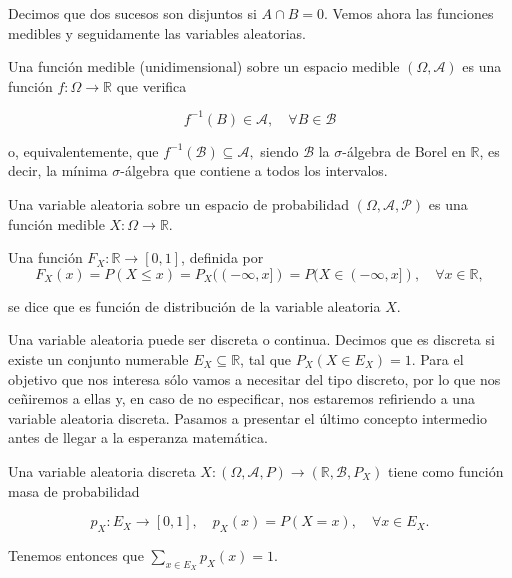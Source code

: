 Decimos que dos sucesos son disjuntos si $A \cap B=0$. Vemos ahora las funciones medibles y seguidamente las variables aleatorias.

\begin{definicion}
	Una función medible (unidimensional) sobre un espacio medible $(\Omega, \mathcal{A})$ es una función $f: \Omega \rightarrow \mathbb{R}$ que verifica

	\begin{equation*}
		f^{-1}(B) \in \mathcal{A}, \quad \forall B \in \mathcal{B}
	\end{equation*} 

	o, equivalentemente, que $f^{-1}(\mathcal{B}) \subseteq \mathcal{A},$ siendo $\mathcal{B}$ la $\sigma$-álgebra de Borel en $\mathbb{R}$, es decir, la mínima $\sigma$-álgebra que contiene a todos los intervalos.

\end{definicion}


\begin{definicion}
	Una variable aleatoria sobre un espacio de probabilidad $(\Omega, \mathcal{A}, \mathcal{P})$ es una función medible $X: \Omega \rightarrow \mathbb{R}$.
\end{definicion}

\begin{definicion}
	Una función $F_X:\mathbb{R} \rightarrow [0,1]$, definida por
	\begin{equation*}
		F_X(x)=P(X \leq x) = P_X((- \infty , x]) = P( X \in (- \infty, x ]), \quad \forall x \in \mathbb{R},
	\end{equation*}

	se dice que es función de distribución de la variable aleatoria $X$.
\end{definicion}

Una variable aleatoria puede ser discreta o continua. Decimos que es discreta si existe un conjunto numerable $E_X \subseteq \mathbb{R}$, tal que $P_X(X \in E_X) = 1$. Para el objetivo que nos interesa sólo vamos a necesitar del tipo discreto, por lo que nos ceñiremos a ellas y, en caso de no especificar, nos estaremos refiriendo a una variable aleatoria discreta. Pasamos a presentar el último concepto intermedio antes de llegar a la esperanza matemática.

\begin{definicion}
	Una variable aleatoria discreta $X: (\Omega, \mathcal{A}, P) \rightarrow (\mathbb{R}, \mathcal{B}, P_X)$ tiene como función masa de probabilidad
	
	\begin{equation*}
		p_X: E_X \rightarrow [0,1], \quad p_X(x) = P(X=x), \quad \forall x \in E_X.
	\end{equation*}

	Tenemos entonces que $\sum_{x \in E_X} p_X(x)=1$.
\end{definicion}


